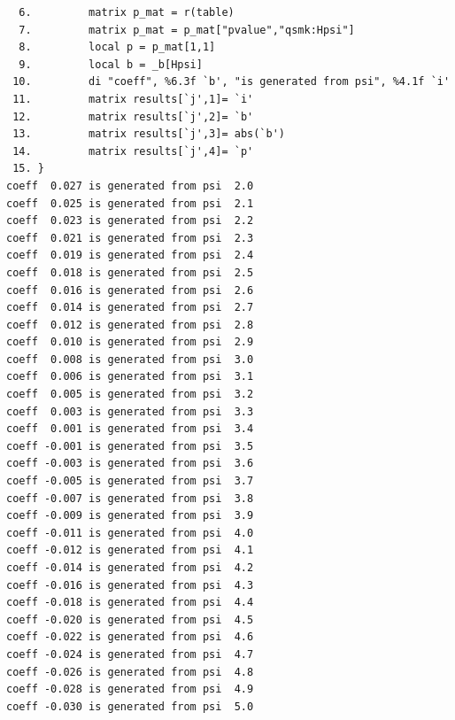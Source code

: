 \documentclass[
  10pt,
]{book}
\begin{document}
\begin{verbatim}
  6.         matrix p_mat = r(table)
  7.         matrix p_mat = p_mat["pvalue","qsmk:Hpsi"]
  8.         local p = p_mat[1,1]
  9.         local b = _b[Hpsi]
 10.         di "coeff", %6.3f `b', "is generated from psi", %4.1f `i'
 11.         matrix results[`j',1]= `i'
 12.         matrix results[`j',2]= `b'
 13.         matrix results[`j',3]= abs(`b')
 14.         matrix results[`j',4]= `p'
 15. }
coeff  0.027 is generated from psi  2.0
coeff  0.025 is generated from psi  2.1
coeff  0.023 is generated from psi  2.2
coeff  0.021 is generated from psi  2.3
coeff  0.019 is generated from psi  2.4
coeff  0.018 is generated from psi  2.5
coeff  0.016 is generated from psi  2.6
coeff  0.014 is generated from psi  2.7
coeff  0.012 is generated from psi  2.8
coeff  0.010 is generated from psi  2.9
coeff  0.008 is generated from psi  3.0
coeff  0.006 is generated from psi  3.1
coeff  0.005 is generated from psi  3.2
coeff  0.003 is generated from psi  3.3
coeff  0.001 is generated from psi  3.4
coeff -0.001 is generated from psi  3.5
coeff -0.003 is generated from psi  3.6
coeff -0.005 is generated from psi  3.7
coeff -0.007 is generated from psi  3.8
coeff -0.009 is generated from psi  3.9
coeff -0.011 is generated from psi  4.0
coeff -0.012 is generated from psi  4.1
coeff -0.014 is generated from psi  4.2
coeff -0.016 is generated from psi  4.3
coeff -0.018 is generated from psi  4.4
coeff -0.020 is generated from psi  4.5
coeff -0.022 is generated from psi  4.6
coeff -0.024 is generated from psi  4.7
coeff -0.026 is generated from psi  4.8
coeff -0.028 is generated from psi  4.9
coeff -0.030 is generated from psi  5.0




\end{verbatim}
\end{document}
